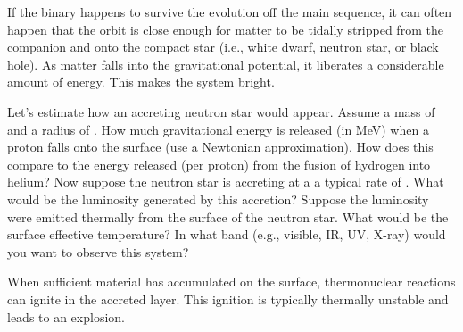  If the binary happens to survive the evolution off the main sequence, it can often happen that the orbit is close enough for matter to be tidally stripped from the companion and  onto the compact star (i.e., white dwarf, neutron star, or black hole). As matter falls into the gravitational potential, it liberates a considerable amount of energy. This makes the system bright.

\begin{exercisebox}
Let's estimate how an accreting neutron star would appear. Assume a mass of  and a radius of . How much gravitational energy is released (in MeV) when a proton falls onto the surface (use a Newtonian approximation). How does this compare to the energy released (per proton) from the fusion of hydrogen into helium? Now suppose the neutron star is accreting at a a typical rate of . What would be the luminosity generated by this accretion? Suppose the luminosity were emitted thermally from the surface of the neutron star. What would be the surface effective temperature? In what band (e.g., visible, IR, UV, X-ray) would you want to observe this system?
\end{exercisebox}

When sufficient material has accumulated on the surface, thermonuclear reactions can ignite in the accreted layer. This ignition is typically thermally unstable and leads to an explosion. 

